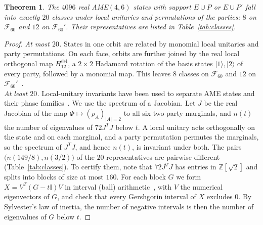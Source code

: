 \documentclass[aps,pra,reprint,superscriptaddress,amsmath,amssymb,longbibliography]{revtex4-2}
\newcommand{\ket}[1]{\lvert #1\rangle}
\theoremstyle{plain}
\newtheorem{theorem}{Theorem}
\begin{document}
\begin{theorem}\label{thm:classes}
The $4096$ real AME$(4,6)$ states with support $E\cup P$ or $E\cup P'$ fall into exactly $20$ classes under local
unitaries and permutations of the parties: $8$ on $\mathcal F_{60}$ and $12$ on $\mathcal F_{60}'$.  Their
representatives are listed in Table~\ref{tab:classes}.
\end{theorem}

\begin{proof}
\emph{At most $20$.}  States in one orbit are related by monomial local unitaries and party permutations.  On each
face, orbits are further joined by the real local orthogonal map $H_{12}^{\otimes4}$, a $2\times2$ Hadamard rotation of
the basis states $\ket1,\ket2$ of every party, followed by a monomial map.  This leaves $8$ classes on $\mathcal F_{60}$ and
$12$ on $\mathcal F_{60}'$~\cite{repo}.\\
\emph{At least $20$.}  Local-unitary invariants have been used to separate AME states and their phase
families~\cite{RAL2022,RL2025}.  We use the spectrum of a Jacobian.  Let $J$ be the real Jacobian of the map $\Phi\mapsto(\rho_A)_{|A|=2}$ to all six two-party
marginals, and $n(t)$ the number of eigenvalues of $72J^TJ$ below $t$.  A local unitary acts orthogonally on the state
and on each marginal, and a party permutation permutes the marginals, so the spectrum of $J^TJ$, and hence $n(t)$, is
invariant under both.  The pairs $\bigl(n(149/8),n(3/2)\bigr)$ of the $20$ representatives are pairwise different
(Table~\ref{tab:classes}).  To certify them, note that $72J^TJ$ has entries in $\mathbb Z[\sqrt2]$ and splits into
blocks of size at most $160$.  For each block $G$ we form $X=V^T(G-t\mathbb I)V$ in interval (ball) arithmetic~\cite{Arb2017},
with $V$ the numerical eigenvectors of $G$, and check that every Gershgorin interval of $X$ excludes $0$.  By
Sylvester's law of inertia, the number of negative intervals is then the number of eigenvalues of $G$ below $t$.
\end{proof}
\end{document}
